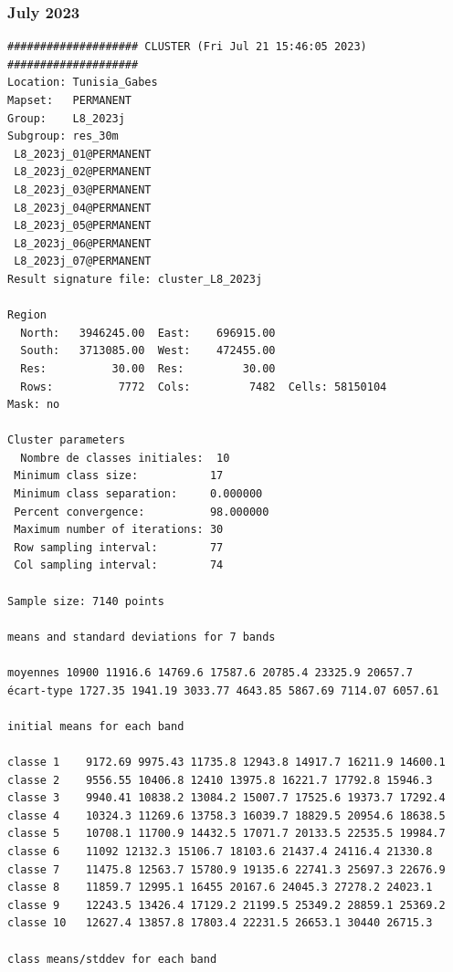 \documentclass[environments,article,submit,pdftex,moreauthors]{Definitions/mdpi}
\begin{document}
\subsubsection[\appendixname~\thesubsubsection]{July 2023}
\begin{scriptsize}
\begin{verbatim}
#################### CLUSTER (Fri Jul 21 15:46:05 2023) ####################
Location: Tunisia_Gabes
Mapset:   PERMANENT
Group:    L8_2023j
Subgroup: res_30m
 L8_2023j_01@PERMANENT
 L8_2023j_02@PERMANENT
 L8_2023j_03@PERMANENT
 L8_2023j_04@PERMANENT
 L8_2023j_05@PERMANENT
 L8_2023j_06@PERMANENT
 L8_2023j_07@PERMANENT
Result signature file: cluster_L8_2023j

Region
  North:   3946245.00  East:    696915.00
  South:   3713085.00  West:    472455.00
  Res:          30.00  Res:         30.00
  Rows:          7772  Cols:         7482  Cells: 58150104
Mask: no

Cluster parameters
  Nombre de classes initiales: 	10
 Minimum class size:           17
 Minimum class separation:     0.000000
 Percent convergence:          98.000000
 Maximum number of iterations: 30
 Row sampling interval:        77
 Col sampling interval:        74

Sample size: 7140 points

means and standard deviations for 7 bands

moyennes 10900 11916.6 14769.6 17587.6 20785.4 23325.9 20657.7
écart-type 1727.35 1941.19 3033.77 4643.85 5867.69 7114.07 6057.61

initial means for each band

classe 1    9172.69 9975.43 11735.8 12943.8 14917.7 16211.9 14600.1
classe 2    9556.55 10406.8 12410 13975.8 16221.7 17792.8 15946.3
classe 3    9940.41 10838.2 13084.2 15007.7 17525.6 19373.7 17292.4
classe 4    10324.3 11269.6 13758.3 16039.7 18829.5 20954.6 18638.5
classe 5    10708.1 11700.9 14432.5 17071.7 20133.5 22535.5 19984.7
classe 6    11092 12132.3 15106.7 18103.6 21437.4 24116.4 21330.8
classe 7    11475.8 12563.7 15780.9 19135.6 22741.3 25697.3 22676.9
classe 8    11859.7 12995.1 16455 20167.6 24045.3 27278.2 24023.1
classe 9    12243.5 13426.4 17129.2 21199.5 25349.2 28859.1 25369.2
classe 10   12627.4 13857.8 17803.4 22231.5 26653.1 30440 26715.3

class means/stddev for each band


\end{verbatim}
\end{scriptsize}
\end{document}
